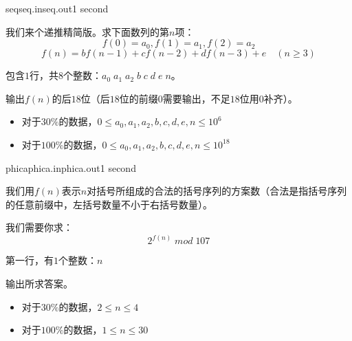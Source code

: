 \documentclass[11pt,a4paper,oneside]{article}
\begin{document}
\begin{problem}{seq}{seq.in}{seq.out}{1 second} 
	
	我们来个递推精简版。求下面数列的第$n$项：
	$$
		f(0) = a_0, f(1) = a_1, f(2) = a_2
	$$
	$$
		f(n) = bf(n-1) + cf(n-2) + df(n-3) + e \quad (n \geq 3)
	$$
	
	\InputFile
	包含$1$行，共$8$个整数：$ a_0 \; a_1 \; a_2 \; b \; c \; d \; e \; n $。
	
	\OutputFile
	输出$f(n)$的后$18$位（后$18$位的前缀$0$需要输出，不足$18$位用$0$补齐）。
	
	\Example
	
	\begin{example}
\end{example}

\Note

\begin{itemize}
	\item 对于$30\%$的数据，$ 0 \leq a_0, a_1, a_2, b, c, d, e, n \leq 10^{6}$
	\item 对于$100\%$的数据，$ 0 \leq a_0, a_1, a_2, b, c, d, e, n \leq 10^{18}$
\end{itemize}

\end{problem}
\begin{problem}{phica}{phica.in}{phica.out}{1 second} 
	
	我们用$f(n)$表示$n$对括号所组成的合法的括号序列的方案数（合法是指括号序列的任意前缀中，左括号数量不小于右括号数量）。
	
	我们需要你求：
	$$
		2^{f(n)} \; mod \; 107
	$$
	
	\InputFile
	第一行，有$1$个整数：$n$
	
	\OutputFile
	输出所求答案。
	
	\Example
	
	\begin{example}
\end{example}

\Note

\begin{itemize}
	\item 对于$30\%$的数据，$2 \leq n \leq  4 $
	\item 对于$100\%$的数据，$ 1 \leq n \leq 30 $
\end{itemize}

\end{problem}
\end{document}
